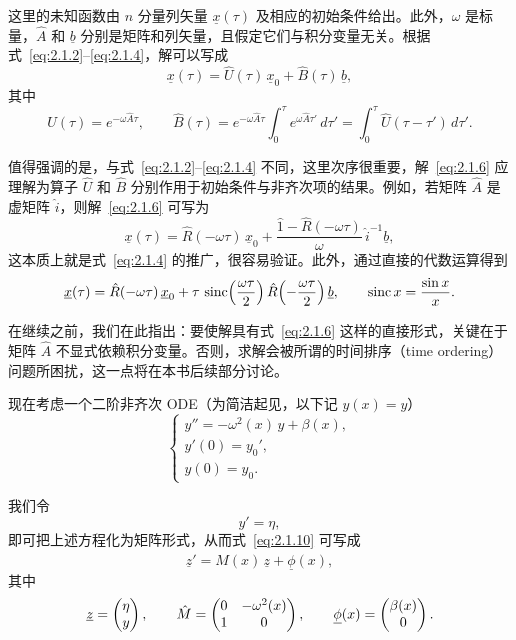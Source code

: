 这里的未知函数由 $n$ 分量列矢量 $\underline{x}(\tau)$ 及相应的初始条件给出。此外，$\omega$ 是标量，$\hat{A}$ 和 $\underline{b}$ 分别是矩阵和列矢量，且假定它们与积分变量无关。根据式~\eqref{eq:2.1.2}--\eqref{eq:2.1.4}，解可以写成
\begin{equation}
\underline{x}(\tau)=\hat{U}(\tau)\,\underline{x}_{0}+\hat{B}(\tau)\,\underline{b},
\label{eq:2.1.6}
\end{equation}
其中
\begin{equation}
\hat{U}(\tau)=e^{-\omega\hat{A}\tau},\qquad
\hat{B}(\tau)=e^{-\omega\hat{A}\tau}\int_{0}^{\tau}e^{\omega\hat{A}\tau'}\,d\tau'
=\int_{0}^{\tau}\hat{U}(\tau-\tau')\,d\tau'.
\label{eq:2.1.7}
\end{equation}

值得强调的是，与式~\eqref{eq:2.1.2}--\eqref{eq:2.1.4} 不同，这里次序很重要，解~\eqref{eq:2.1.6} 应理解为算子 $\hat{U}$ 和 $\hat{B}$ 分别作用于初始条件与非齐次项的结果。例如，若矩阵 $\hat{A}$ 是虚矩阵 $\hat{i}$，则解~\eqref{eq:2.1.6} 可写为
\begin{equation}
\underline{x}(\tau)=\hat{R}(-\omega\tau)\,\underline{x}_{0}
+\frac{\hat{1}-\hat{R}(-\omega\tau)}{\omega}\,\hat{i}^{-1}\underline{b},
\label{eq:2.1.8}
\end{equation}
这本质上就是式~\eqref{eq:2.1.4} 的推广，很容易验证。此外，通过直接的代数运算得到
\begin{equation}
\underline{x}(\tau)=\hat{R}(-\omega\tau)\,\underline{x}_{0}
+\tau\,\operatorname{sinc}\!\left(\frac{\omega\tau}{2}\right)
\hat{R}\!\left(-\frac{\omega\tau}{2}\right)\underline{b},
\qquad \operatorname{sinc} x=\frac{\sin x}{x}.
\label{eq:2.1.9}
\end{equation}

在继续之前，我们在此指出：要使解具有式~\eqref{eq:2.1.6} 这样的直接形式，关键在于矩阵 $\hat{A}$ 不显式依赖积分变量。否则，求解会被所谓的时间排序（time ordering）问题所困扰，这一点将在本书后续部分讨论。

现在考虑一个二阶非齐次 ODE（为简洁起见，以下记 $y(x)=y$）
\begin{equation}
\begin{cases}
y''=-\omega^{2}(x)\,y+\beta(x),\\[1mm]
y'(0)=y_{0}',\\
y(0)=y_{0}.
\end{cases}
\label{eq:2.1.10}
\end{equation}

我们令
\begin{equation}
y'=\eta,
\label{eq:2.1.11}
\end{equation}
即可把上述方程化为矩阵形式，从而式~\eqref{eq:2.1.10} 可写成
\begin{equation}
\underline{z}'=\hat{M}(x)\,\underline{z}+\underline{\phi}(x),
\label{eq:2.1.12}
\end{equation}
其中
\begin{equation}
\underline{z}=\begin{pmatrix}\eta\\y\end{pmatrix},\qquad
\hat{M}=\begin{pmatrix}0&-\omega^{2}(x)\\1&0\end{pmatrix},\qquad
\underline{\phi}(x)=\begin{pmatrix}\beta(x)\\0\end{pmatrix}.
\label{eq:2.1.13}
\end{equation}


